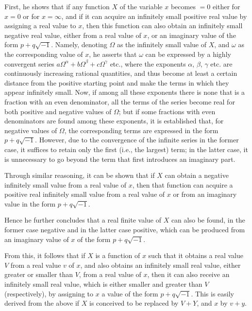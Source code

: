 \documentclass[12pt]{memoir}
\theoremstyle{plain}
\theoremstyle{remark}
\begin{document}
First, he shows that if any function \(X\) of the variable \(x\) becomes \(= 0\) either for \(x = 0\) or for \(x = \infty\), and if it can acquire an infinitely small positive real value by assigning a real value to \(x\), then this function can also obtain an infinitely small negative real value, either from a real value of \(x\), or an imaginary value of the form \(p+q\surd{-1}\).  Namely, denoting \(\Omega\) as the infinitely small value of \(X\), and \(\omega\) as the corresponding value of \(x\), he asserts that \(\omega\) can be expressed by a highly convergent series \(a\Omega^{\alpha} + b \Omega^{\beta} + c \Omega^{\gamma} \) etc., where the exponents \(\alpha\), \(\beta\), \(\gamma\) etc. are continuously increasing rational quantities, and thus become at least a certain distance from the positive starting point and make the terms in which they appear infinitely small. Now, if among all these exponents there is none that is a fraction with an even denominator, all the terms of the series become real for both positive and negative values of \(\Omega\); but if some fractions with even denominators are found among these exponents, it is established that, for negative values of \(\Omega\), the corresponding terms are expressed in the form \(p+q\surd{-1}\). However, due to the convergence of the infinite series in the former case, it suffices to retain only the first (i.e., the largest) term; in the latter case, it is unnecessary to go beyond the term that first introduces an imaginary part.

Through similar reasoning, it can be shown that if \(X\) can obtain a negative infinitely small value from a real value of \(x\), then that function can acquire a positive real infinitely small value from a real value of \(x\) or from an imaginary value in the form \(p+q\surd{-1}\).

Hence he further concludes that a real finite value of \(X\) can also be found, in the former case negative and in the latter case positive, which can be produced from an imaginary value of \(x\) of the form \(p+q\surd{-1}\).

From this, it follows that if \(X\) is a function of \(x\) such that it obtains a real value \(V\) from a real value \(v\) of \(x\), and also obtains an infinitely small real value, either greater or smaller than \(V\), from a real value of \(x\), then it can also receive an infinitely small real value, which is either smaller and greater than \(V\) (respectively), by assigning to \(x\) a value of the form \(p+q\surd{-1}\). This is easily derived from the above if \(X\) is conceived to be replaced by \(V + Y\), and \(x\) by \(v+y\).
\end{document}
